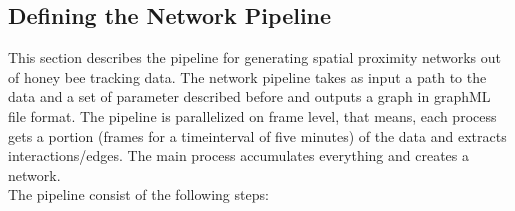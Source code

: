 \subsection{Defining the Network Pipeline}

This section describes the pipeline for generating spatial proximity networks out of honey bee tracking data. The network pipeline takes as input a path to the data  and a set of parameter described before and outputs a graph in graphML file format. The pipeline is parallelized on frame level, that means, each process gets a portion (frames for a timeinterval of five minutes) of the data and extracts interactions/edges. The main process accumulates everything and creates a network.\\

The pipeline consist of the following steps:

